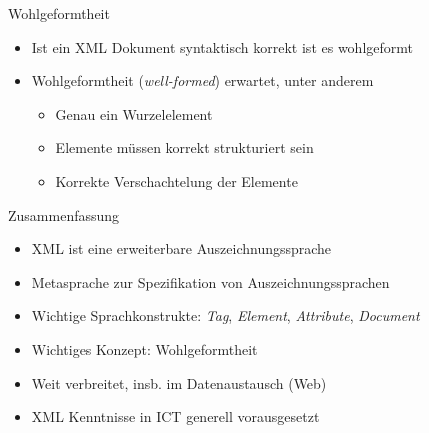 \documentclass{beamer}
\begin{document}
\begin{frame}{Wohlgeformtheit}
	
	\begin{itemize}
		\item Ist ein XML Dokument syntaktisch korrekt ist es wohlgeformt
		\item Wohlgeformtheit (\emph{well-formed}) erwartet, unter anderem
		\begin{itemize}
			\item Genau ein Wurzelelement
			\item Elemente müssen korrekt strukturiert sein
			\item Korrekte Verschachtelung der Elemente
		\end{itemize} 
	\end{itemize}
	
\end{frame}

\begin{frame}{Zusammenfassung}
	
	\begin{itemize}
		\item XML ist eine erweiterbare Auszeichnungssprache
		\item Metasprache zur Spezifikation von Auszeichnungssprachen
		\item Wichtige Sprachkonstrukte: \emph{Tag}, \emph{Element}, \emph{Attribute}, \emph{Document}
		\item Wichtiges Konzept: Wohlgeformtheit
		\item Weit verbreitet, insb. im Datenaustausch (Web)
		\item XML Kenntnisse in ICT generell vorausgesetzt
	\end{itemize}
	
\end{frame}
\end{document}
